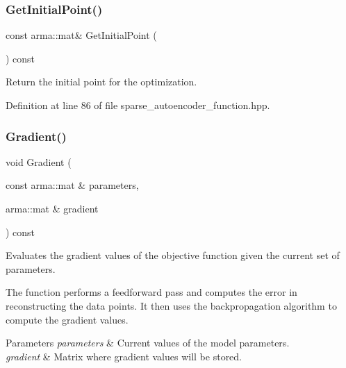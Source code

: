 \subsubsection{Get\+Initial\+Point()}
{\footnotesize\ttfamily const arma\+::mat\& Get\+Initial\+Point (\begin{DoxyParamCaption}{ }\end{DoxyParamCaption}) const\hspace{0.3cm}{\ttfamily [inline]}}



Return the initial point for the optimization. 



Definition at line 86 of file sparse\+\_\+autoencoder\+\_\+function.\+hpp.

\mbox{\label{classmlpack_1_1nn_1_1SparseAutoencoderFunction_ab9a604f48072ce6c08443519ff787a73}} 
\subsubsection{Gradient()}
{\footnotesize\ttfamily void Gradient (\begin{DoxyParamCaption}\item[{const arma\+::mat \&}]{parameters,  }\item[{arma\+::mat \&}]{gradient }\end{DoxyParamCaption}) const}



Evaluates the gradient values of the objective function given the current set of parameters. 

The function performs a feedforward pass and computes the error in reconstructing the data points. It then uses the backpropagation algorithm to compute the gradient values.


\begin{DoxyParams}{Parameters}
{\em parameters} & Current values of the model parameters. \\
\hline
{\em gradient} & Matrix where gradient values will be stored. \\
\hline
\end{DoxyParams}
\mbox{\label{classmlpack_1_1nn_1_1SparseAutoencoderFunction_aef6f7e6478c5268a8762768f2bed7cf3}} 
